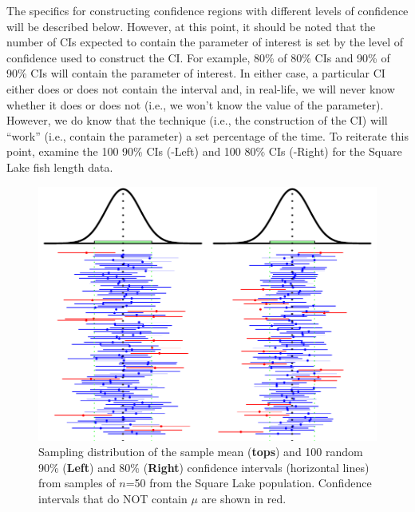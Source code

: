 \documentclass[10pt,openany]{book}\usepackage[]{graphicx}\usepackage[]{color}
\newenvironment{knitrout}{}{} %
\begin{document}
The specifics for constructing confidence regions with different levels of confidence will be described below.  However, at this point, it should be noted that the number of CIs expected to contain the parameter of interest is set by the level of confidence used to construct the CI.  For example, 80\% of 80\% CIs and 90\% of 90\% CIs will contain the parameter of interest.  In either case, a particular CI either does or does not contain the interval and, in real-life, we will never know whether it does or does not (i.e., we won't know the value of the parameter).  However, we do know that the technique (i.e., the construction of the CI) will ``work'' (i.e., contain the parameter) a set percentage of the time.  To reiterate this point, examine the 100 90\% CIs (-Left) and 100 80\% CIs (-Right) for the Square Lake fish length data.

\begin{knitrout}
\color{fgcolor}\begin{figure}[hbtp]

{\centering \includegraphics[width=.95\linewidth]{Figs/CI9080Ex-1} 

}

\caption[Sampling distribution of the sample mean (\textbf{tops}) and 100 random 90\% (\textbf{Left}) and 80\% (\textbf{Right}) confidence intervals (horizontal lines) from samples of $n$=50 from the Square Lake population]{Sampling distribution of the sample mean (\textbf{tops}) and 100 random 90\% (\textbf{Left}) and 80\% (\textbf{Right}) confidence intervals (horizontal lines) from samples of $n$=50 from the Square Lake population.  Confidence intervals that do NOT contain $\mu$ are shown in red.}\label{fig:CI9080Ex}
\end{figure}


\end{knitrout}
\end{document}
